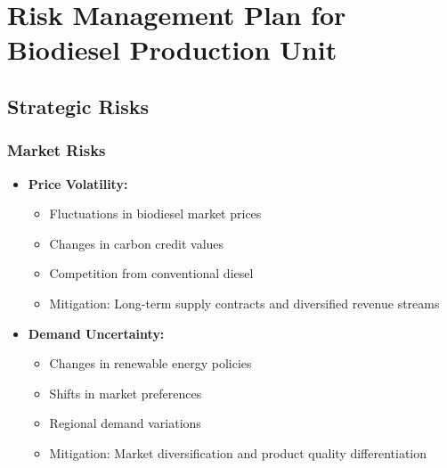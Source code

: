 \section{Risk Management Plan for Biodiesel Production Unit}

\subsection{Strategic Risks}

\subsubsection{Market Risks}
\begin{itemize}
    \item \textbf{Price Volatility:}
    \begin{itemize}
        \item Fluctuations in biodiesel market prices
        \item Changes in carbon credit values
        \item Competition from conventional diesel
        \item Mitigation: Long-term supply contracts and diversified revenue streams
    \end{itemize}
    
    \item \textbf{Demand Uncertainty:}
    \begin{itemize}
        \item Changes in renewable energy policies
        \item Shifts in market preferences
        \item Regional demand variations
        \item Mitigation: Market diversification and product quality differentiation
    \end{itemize}
\end{itemize}

